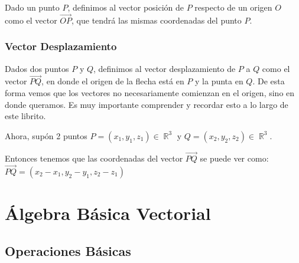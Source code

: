 \documentclass[12pt, fleqn]{report}                             %
\theoremstyle{break}                                            %
\DeclareMathOperator \Reals        {\mathbb{R}}                 %
\newcommand{\lVec}[1]{\overrightarrow{#1}}                      %
\begin{document}
                Dado un punto $P$, definimos al vector posición de $P$ respecto de un origen $O$ como
                el vector $\lVec{OP}$, que tendrá las mismas coordenadas del punto $P$.
            
            \subsection{Vector Desplazamiento}
            
                Dados dos puntos $P$ y $Q$, definimos al vector desplazamiento de $P$ a $Q$ como el
                vector $\lVec{PQ}$, en donde el origen de la flecha está en $P$ y la punta en $Q$.
                De esta forma vemos que los vectores no necesariamente comienzan en el origen,
                sino en donde queramos. Es muy importante comprender y recordar esto a lo largo
                de este librito.

                Ahora, supón 2 puntos $P = (x_1, y_1, z_1) \in \Reals^3$ y $Q = (x_2, y_2, z_2) \in \Reals^3$.

                Entonces tenemos que las coordenadas del vector $\lVec{PQ}$ se puede ver como:\\
                $\lVec{PQ} = (x_2 - x_1, y_2 - y_1, z_2 - z_1)$




    \chapter{Álgebra Básica Vectorial}
            

        \clearpage
        \section{Operaciones Básicas}
            
\end{document}
